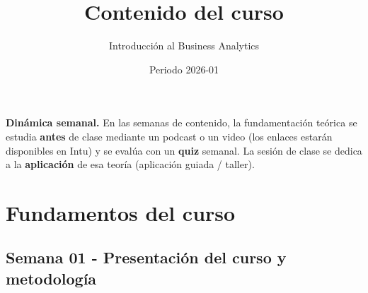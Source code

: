 \documentclass{article}
\title{Contenido del curso}
\author{Introducción al Business Analytics}
\date{Periodo 2026-01}
\begin{document}
\maketitle
\tableofcontents
\clearpage

\noindent\textbf{Dinámica semanal.} En las semanas de contenido, la fundamentación teórica se estudia \textbf{antes} de clase mediante un podcast o un video (los enlaces estarán disponibles en Intu) y se evalúa con un \textbf{quiz} semanal. La sesión de clase se dedica a la \textbf{aplicación} de esa teoría (aplicación guiada / taller).
\vspace{0.3cm}

\section{Fundamentos del curso}

\subsection{Semana 01 - Presentación del curso y metodología}
\vspace{0.2 cm}
\end{document}

